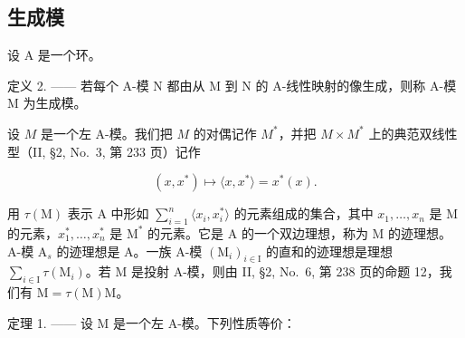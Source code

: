 \subsection{生成模}

设 \(\mathrm{A}\) 是一个环。

定义 2. —— 若每个 A-模 N 都由从 M 到 N 的 A-线性映射的像生成，则称 A-模 M 为生成模。

设 \(M\) 是一个左 A-模。我们把 \(M\) 的对偶记作 \(M^*\)，并把 \(M \times M^*\) 上的典范双线性型（II, §2, No.~3, 第 233 页）记作

\[
(x, x ^ {*}) \mapsto \langle x, x ^ {*} \rangle = x ^ {*} (x).
\]

用 \(\tau(\mathrm{M})\) 表示 A 中形如 \(\sum_{i=1}^{n}\langle x_i,x_i^*\rangle\) 的元素组成的集合，其中 \(x_1,\ldots ,x_n\) 是 M 的元素，\(x_1^*,\ldots ,x_n^*\) 是 \(\mathrm{M}^*\) 的元素。它是 A 的一个双边理想，称为 M 的迹理想。A-模 \(\mathrm{A}_s\) 的迹理想是 A。一族 A-模 \((\mathrm{M}_i)_{i\in \mathrm{I}}\) 的直和的迹理想是理想 \(\sum_{i\in \mathrm{I}}\tau(\mathrm{M}_i)\)。若 M 是投射 A-模，则由 II, §2, No.~6, 第 238 页的命题 12，我们有 \(\mathrm{M} = \tau(\mathrm{M})\mathrm{M}\)。

定理 1. —— 设 M 是一个左 A-模。下列性质等价：


